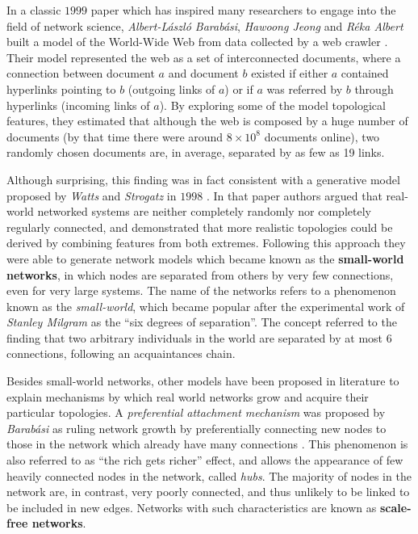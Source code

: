 In a classic $1999$ paper which has inspired many researchers to engage into the field of network science, \textit{Albert-László Barabási}, \textit{Hawoong Jeong} and \textit{Réka Albert} built a model of the World-Wide Web from data collected by a web crawler \cite{Albert1999}. 
Their model represented the web as a set of interconnected documents, where a connection between document $a$ and document $b$ existed if either $a$ contained hyperlinks pointing to $b$ (outgoing links of $a$) or if $a$ was referred by $b$ through hyperlinks (incoming links of $a$).
By exploring some of the model topological features, they estimated that although the web is composed by a huge number of documents (by that time there were around $8 \times 10^8$ documents online), two randomly chosen documents are, in average, separated by as few as 19 links. 

Although surprising, this finding was in fact consistent with a generative model proposed by \textit{Watts} and \textit{Strogatz} in $1998$ \cite{Watts1998}.
In that paper authors argued that real-world networked systems are neither completely randomly nor completely regularly connected, and demonstrated that more realistic topologies could be derived by combining features from both extremes.
Following this approach they were able to generate network models which became known as the \textbf{small-world networks}, in which nodes are separated from others by very few connections, even for very large systems.
The name of the networks refers to a phenomenon known as the \textit{small-world}, which became popular after the experimental work of \textit{Stanley Milgram} \cite{Milgram1969} as the ``six degrees of separation''.
The concept referred to the finding that two arbitrary individuals in the world are separated by at most 6 connections, following an acquaintances chain.
 
Besides small-world networks, other models have been proposed in literature to explain mechanisms by which real world networks grow and acquire their particular topologies.
A \textit{preferential attachment mechanism} was proposed by \textit{Barabási} as ruling network growth by preferentially connecting new nodes to those in the network which already have many connections \cite{Albert2002}. 
This phenomenon is also referred to as ``the rich gets richer'' effect, and allows the appearance of few heavily connected nodes in the network, called \textit{hubs}. 
The majority of nodes in the network are, in contrast, very poorly connected, and thus unlikely to be linked to be included in new edges.
Networks with such characteristics are known as \textbf{scale-free networks}.

